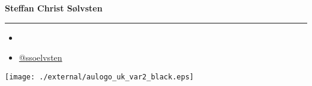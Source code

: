 \documentclass[english, aspectratio=169]{beamer}
\begin{document}
\begin{frame}{}

  {\Large \textbf{Steffan Christ Sølvsten}}
  {\hrule width0.5\linewidth}

  \vspace{5pt}
  
  \begin{itemize}
  \item[\faIcon{envelope}] 
  \item[\faIcon{twitter}] \href{https://www.twitter.com/ssoelvsten}{@ssoelvsten}
  \end{itemize}

  \vspace{20pt}

  \texttt{[image: ./external/aulogo\_uk\_var2\_black.eps]}
\end{frame}
\end{document}
